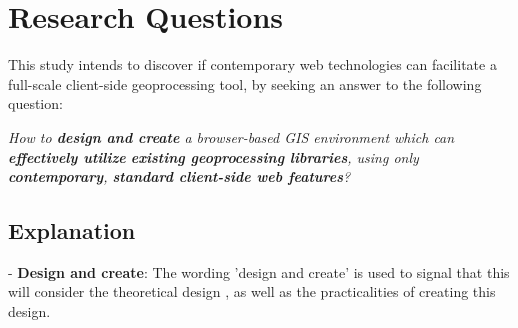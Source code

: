 









\newpage
\section{Research Questions}

This study intends to discover if contemporary web technologies can facilitate a full-scale client-side geoprocessing tool, by seeking an answer to the following question: 

\textit{How to \textbf{design and create} a browser-based GIS environment which can \textbf{effectively utilize} \textbf{existing geoprocessing libraries}, using only \textbf{contemporary}, \textbf{standard client-side web features}?}

\subsection*{Explanation}


- \textbf{Design and create}: The wording 'design and create' is used to signal that this will consider the theoretical design , as well as the practicalities of creating this design. 

